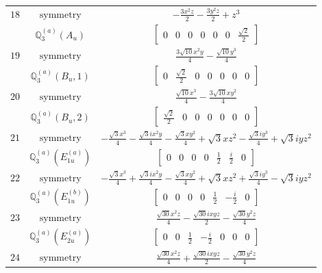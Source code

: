 \documentclass[fleqn,8pt,landscape]{jsarticle}
\begin{document}
\begin{longtable}{ccc}
$ 18 $ & $ \text{symmetry} $ & $ - \frac{3 x^{2} z}{2} - \frac{3 y^{2} z}{2} + z^{3} $ \\
$  $ & $ \mathbb{Q}_{3}^{(a)}(A_{u}) $ & $ \begin{bmatrix} 0 & 0 & 0 & 0 & 0 & 0 & \frac{\sqrt{2}}{2} \end{bmatrix} $ \\ \hline
$ 19 $ & $ \text{symmetry} $ & $ \frac{3 \sqrt{10} x^{2} y}{4} - \frac{\sqrt{10} y^{3}}{4} $ \\
$  $ & $ \mathbb{Q}_{3}^{(a)}(B_{u},1) $ & $ \begin{bmatrix} 0 & \frac{\sqrt{2}}{2} & 0 & 0 & 0 & 0 & 0 \end{bmatrix} $ \\ \hline
$ 20 $ & $ \text{symmetry} $ & $ \frac{\sqrt{10} x^{3}}{4} - \frac{3 \sqrt{10} x y^{2}}{4} $ \\
$  $ & $ \mathbb{Q}_{3}^{(a)}(B_{u},2) $ & $ \begin{bmatrix} \frac{\sqrt{2}}{2} & 0 & 0 & 0 & 0 & 0 & 0 \end{bmatrix} $ \\ \hline
$ 21 $ & $ \text{symmetry} $ & $ - \frac{\sqrt{3} x^{3}}{4} - \frac{\sqrt{3} i x^{2} y}{4} - \frac{\sqrt{3} x y^{2}}{4} + \sqrt{3} x z^{2} - \frac{\sqrt{3} i y^{3}}{4} + \sqrt{3} i y z^{2} $ \\
$  $ & $ \mathbb{Q}_{3}^{(a)}(E_{1u}^{(a)}) $ & $ \begin{bmatrix} 0 & 0 & 0 & 0 & \frac{1}{2} & \frac{i}{2} & 0 \end{bmatrix} $ \\ \hline
$ 22 $ & $ \text{symmetry} $ & $ - \frac{\sqrt{3} x^{3}}{4} + \frac{\sqrt{3} i x^{2} y}{4} - \frac{\sqrt{3} x y^{2}}{4} + \sqrt{3} x z^{2} + \frac{\sqrt{3} i y^{3}}{4} - \sqrt{3} i y z^{2} $ \\
$  $ & $ \mathbb{Q}_{3}^{(a)}(E_{1u}^{(b)}) $ & $ \begin{bmatrix} 0 & 0 & 0 & 0 & \frac{1}{2} & - \frac{i}{2} & 0 \end{bmatrix} $ \\ \hline
$ 23 $ & $ \text{symmetry} $ & $ \frac{\sqrt{30} x^{2} z}{4} - \frac{\sqrt{30} i x y z}{2} - \frac{\sqrt{30} y^{2} z}{4} $ \\
$  $ & $ \mathbb{Q}_{3}^{(a)}(E_{2u}^{(a)}) $ & $ \begin{bmatrix} 0 & 0 & \frac{1}{2} & - \frac{i}{2} & 0 & 0 & 0 \end{bmatrix} $ \\ \hline
$ 24 $ & $ \text{symmetry} $ & $ \frac{\sqrt{30} x^{2} z}{4} + \frac{\sqrt{30} i x y z}{2} - \frac{\sqrt{30} y^{2} z}{4} $ \\

\end{longtable}
\end{document}
